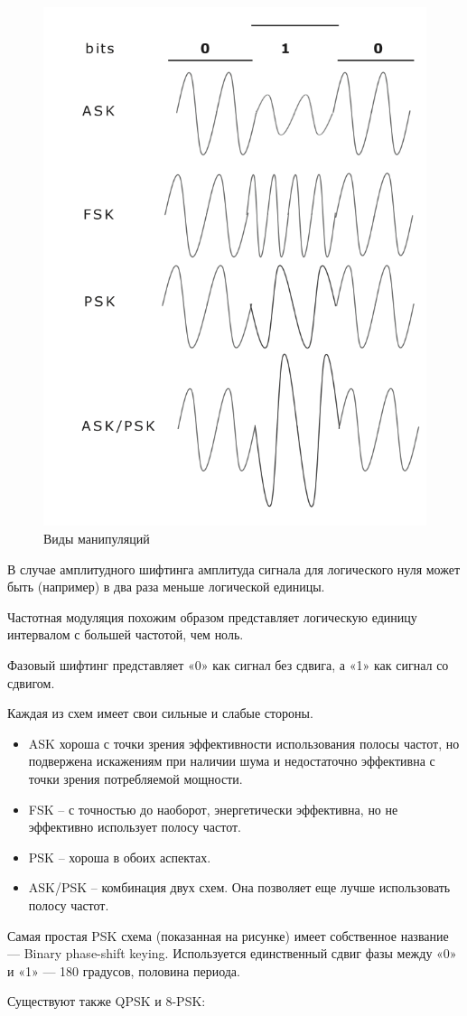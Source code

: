 \begin{figure}[H]
	\begin{center}
		\includegraphics[width=0.4\linewidth]{pics/modulations}
		\caption{Виды манипуляций}
		\label{fig:modulations}
	\end{center}
\end{figure}

В случае амплитудного шифтинга амплитуда сигнала для логического нуля может быть (например) в два раза меньше логической единицы.

Частотная модуляция похожим образом представляет логическую единицу интервалом с большей частотой, чем ноль.

Фазовый шифтинг представляет «0» как сигнал без сдвига, а «1» как сигнал со сдвигом.

Каждая из схем имеет свои сильные и слабые стороны.
\begin{itemize}
	\item ASK хороша с точки зрения эффективности использования полосы частот, но подвержена искажениям при наличии шума и недостаточно эффективна с точки зрения потребляемой мощности.
	\item FSK – с точностью до наоборот, энергетически эффективна, но не эффективно использует полосу частот.
	\item PSK – хороша в обоих аспектах.
	\item ASK/PSK – комбинация двух схем. Она позволяет еще лучше использовать полосу частот.
\end{itemize}

Самая простая PSK схема (показанная на рисунке) имеет собственное название — Binary phase-shift keying. Используется единственный сдвиг фазы между «0» и «1» — 180 градусов, половина периода.

Существуют также QPSK и 8-PSK:

